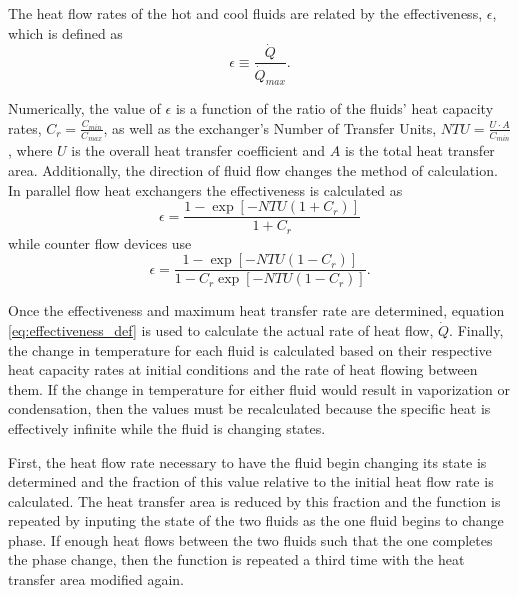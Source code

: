 The heat flow rates of the hot and cool fluids are related by the effectiveness, $\epsilon$, which is defined as 
\begin{equation}
\label{eq:effectiveness_def}
\epsilon \equiv \frac{\dot{Q}}{\dot{Q}_{max}}.
\end{equation}

Numerically, the value of $\epsilon$ is a function of the ratio of the fluids' heat capacity rates, $C_r = \frac{C_{min}}{C_{max}}$, as well as the exchanger's Number of Transfer Units, $NTU = \frac{U \cdot A}{C_{min}}$, where $U$ is the overall heat transfer coefficient and $A$ is the total heat transfer area. Additionally, the direction of fluid flow changes the method of calculation. In parallel flow heat exchangers the effectiveness is calculated as
\begin{equation}
\epsilon = \frac{1 - \exp\left[-NTU\left(1 + C_r\right)\right]}{1 + C_r}
\end{equation}
while counter flow devices use
\begin{equation}
\epsilon = \frac{1 - \exp\left[-NTU\left(1 - C_r\right)\right]}{1 - C_r\exp\left[-NTU\left(1 - C_r\right)\right]}.
\end{equation}

Once the effectiveness and maximum heat transfer rate are determined, equation \ref{eq:effectiveness_def} is used to calculate the actual rate of heat flow, $\dot{Q}$. Finally, the change in temperature for each fluid is calculated based on their respective heat capacity rates at initial conditions and the rate of heat flowing between them. 
If the change in temperature for either fluid would result in vaporization or condensation, then the values must be recalculated because the specific heat is effectively infinite while the fluid is changing states. 

First, the heat flow rate necessary to have the fluid begin changing its state is determined and the fraction of this value relative to the initial heat flow rate is calculated. 
The heat transfer area is reduced by this fraction and the function is repeated by inputing the state of the two fluids as the one fluid begins to change phase. If enough heat flows between the two fluids such that the one completes the phase change, then the function is repeated a third time with the heat transfer area modified again. 

